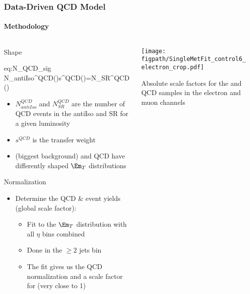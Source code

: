 \begin{frame}
	\frametitle{Data-Driven QCD Model}
	\framesubtitle{Methodology}
	\vspace*{-0.24cm}
	\begin{columns}[T]
		\begin{column}{0.49\textwidth}
			\vspace*{-0.3cm}
			\begin{block}{Shape}
				\vspace*{-0.35cm}
				\begin{aeq}{eq:N_QCD_sig}
					N_{antiIso}^{QCD}\left(\eta\right){\cdot}s^{QCD}\left(\eta\right)=N_{SR}^{QCD}\left(\eta\right)
				\end{aeq}
				\vspace*{-0.35cm}
				\begin{itemize}
					\footnotesize
					\item $N_{antiIso}^{QCD}$ and $N_{SR}^{QCD}$ are the number of QCD events in the antiIso and SR for a given luminosity
					\item $s^{QCD}$ is the transfer weight
					\item \Wjets (biggest background) and QCD have differently shaped $\Em_{T}$ distributions
				\end{itemize}
			\end{block}
			\vspace*{-0.25cm}
			\begin{block}{Normalization}
				\begin{itemize}
					\footnotesize
					\item Determine the QCD \& \Wjets event yields (global scale factor):
					\begin{itemize}
						\footnotesize
						\item Fit to the $\Em_{T}$ distribution with all $\eta$ bins combined
						\item Done in the $\geqslant2$ jets bin
						\item The fit gives us the QCD normalization and a scale factor for \Wjets (very close to 1)
					\end{itemize}
				\end{itemize}
			\end{block}
		\end{column}
		\begin{column}{0.48\textwidth}
			\texttt{[image: \\figpath/SingleMetFit\_control6\_electron\_crop.pdf]}
			\begin{table}[ht]
				\caption{\scriptsize{Absolute scale factors for the \Wjets and QCD samples in the electron and muon channels}}

\end{table}
\end{column}
\end{columns}
\end{frame}
